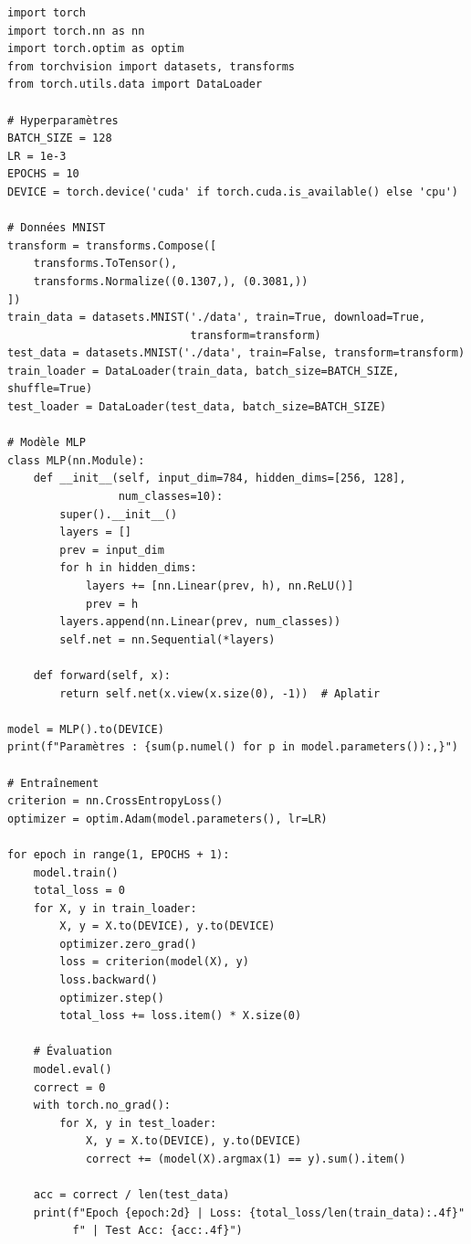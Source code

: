 \begin{codeblock}[title=\textbf{MLP en PyTorch --- Classification MNIST}]
\begin{verbatim}
import torch
import torch.nn as nn
import torch.optim as optim
from torchvision import datasets, transforms
from torch.utils.data import DataLoader

# Hyperparamètres
BATCH_SIZE = 128
LR = 1e-3
EPOCHS = 10
DEVICE = torch.device('cuda' if torch.cuda.is_available() else 'cpu')

# Données MNIST
transform = transforms.Compose([
    transforms.ToTensor(),
    transforms.Normalize((0.1307,), (0.3081,))
])
train_data = datasets.MNIST('./data', train=True, download=True,
                            transform=transform)
test_data = datasets.MNIST('./data', train=False, transform=transform)
train_loader = DataLoader(train_data, batch_size=BATCH_SIZE, shuffle=True)
test_loader = DataLoader(test_data, batch_size=BATCH_SIZE)

# Modèle MLP
class MLP(nn.Module):
    def __init__(self, input_dim=784, hidden_dims=[256, 128],
                 num_classes=10):
        super().__init__()
        layers = []
        prev = input_dim
        for h in hidden_dims:
            layers += [nn.Linear(prev, h), nn.ReLU()]
            prev = h
        layers.append(nn.Linear(prev, num_classes))
        self.net = nn.Sequential(*layers)

    def forward(self, x):
        return self.net(x.view(x.size(0), -1))  # Aplatir

model = MLP().to(DEVICE)
print(f"Paramètres : {sum(p.numel() for p in model.parameters()):,}")

# Entraînement
criterion = nn.CrossEntropyLoss()
optimizer = optim.Adam(model.parameters(), lr=LR)

for epoch in range(1, EPOCHS + 1):
    model.train()
    total_loss = 0
    for X, y in train_loader:
        X, y = X.to(DEVICE), y.to(DEVICE)
        optimizer.zero_grad()
        loss = criterion(model(X), y)
        loss.backward()
        optimizer.step()
        total_loss += loss.item() * X.size(0)

    # Évaluation
    model.eval()
    correct = 0
    with torch.no_grad():
        for X, y in test_loader:
            X, y = X.to(DEVICE), y.to(DEVICE)
            correct += (model(X).argmax(1) == y).sum().item()

    acc = correct / len(test_data)
    print(f"Epoch {epoch:2d} | Loss: {total_loss/len(train_data):.4f}"
          f" | Test Acc: {acc:.4f}")
\end{verbatim}
\end{codeblock}

